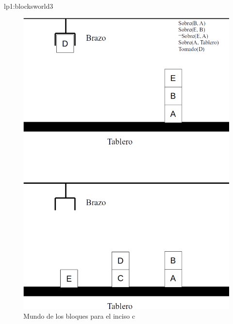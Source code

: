 \begin{defproblem}{lp1:blocksworld3}
\begin{onlyproblem}
		\begin{figure}
			\centering
			\includegraphics[width=0.7\linewidth]{Blocksworld3}
			\caption{Mundo de los bloques para el inciso c}
			\label{fig:blocksworld3}
		\end{figure}
	
	\end{onlyproblem}%
	\begin{onlysolution}%
		
	\end{onlysolution}%
\end{defproblem}

